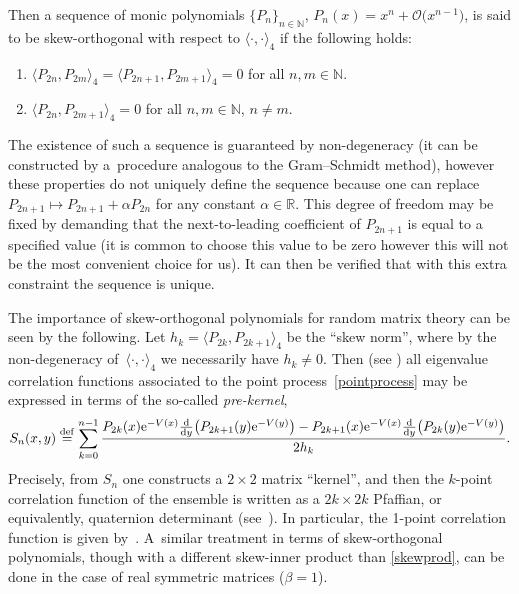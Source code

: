 Then a sequence of monic polynomials $\{ P_n \}_{n \in \mathbb{N}}$, $P_n(x) = x^n + \mathcal{O}\big(x^{n-1}\big)$, is said to be skew-orthogonal with respect to $\langle \cdot, \cdot \rangle_4$ if the following holds:
\begin{enumerate}\itemsep=0pt
\item[(1)] $\langle P_{2n}, P_{2m} \rangle_4 = \langle P_{2n+1}, P_{2m+1} \rangle_4 = 0$ for all $n,m \in \mathbb{N}$.
\item[(2)] $\langle P_{2n}, P_{2m+1} \rangle_4 = 0$ for all $n, m \in \mathbb{N}$, $n\neq m$.
\end{enumerate}
The existence of such a sequence is guaranteed by non-degeneracy (it can be constructed by a~procedure analogous to the Gram--Schmidt method), however these properties do not uniquely define the sequence because one can replace $P_{2n+1} \mapsto P_{2n+1} + \alpha P_{2n}$ for any constant $\alpha \in \mathbb{R}$. This degree of freedom may be fixed by demanding that the next-to-leading coefficient of $P_{2n+1}$ is equal to a specified value (it is common to choose this value to be zero however this will not be the most convenient choice for us). It can then be verified that with this extra constraint the sequence is unique.

The importance of skew-orthogonal polynomials for random matrix theory can be seen by the following. Let $h_k = \langle P_{2k}, P_{2k+1} \rangle_4$ be the \enquote{skew norm}, where by the non-degeneracy of~${\langle \cdot, \cdot \rangle_4}$ we necessarily have $h_k \neq 0$. Then (see \cite[Propositions~6.1.6 and 6.1.7]{loggases}) all eigenvalue correlation functions associated to the point process~\eqref{pointprocess} may be expressed in terms of the so-called \textit{pre-kernel},
\begin{equation}\label{prekernel}
S_n(x,y) \overset{\mathrm{def}}{=} \sum_{k=0}^{n-1} \frac{ P_{2k}(x) {\rm e}^{-V(x)} \frac{\rm d}{{\rm d}y}\big( P_{2k+1}(y) {\rm e}^{-V(y)} \big) - P_{2k+1}(x) {\rm e}^{-V(x)} \frac{\rm d}{{\rm d}y}\big( P_{2k}(y) {\rm e}^{-V(y)} \big)}{2 h_k}.
\end{equation}
Precisely, from $S_n$ one constructs a $2 \times 2$ matrix \enquote{kernel}, and then the $k$-point correlation function of the ensemble is written as a $2k \times 2k$ Pfaffian, or equivalently, quaternion determinant (see~\cite[Chapter 6]{loggases}). In particular, the 1-point correlation function is given by~. A~similar treatment in terms of skew-orthogonal polynomials, though with a different skew-inner product than \eqref{skewprod}, can be done in the case of real symmetric matrices ($\beta =1$).
